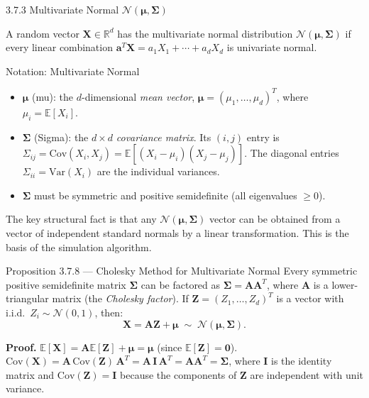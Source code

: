 \documentclass[aspectratio=169,10pt]{beamer}
\newcommand{\EE}{\mathbb{E}}
\newcommand{\RR}{\mathbb{R}}
\newcommand{\NN}{\mathcal{N}}
\begin{document}
\begin{frame}[allowframebreaks]{3.7.3 Multivariate Normal $\NN(\boldsymbol{\mu}, \boldsymbol{\Sigma})$}

A random vector $\mathbf{X} \in \RR^d$ has the multivariate normal distribution
$\NN(\boldsymbol{\mu}, \boldsymbol{\Sigma})$ if every linear combination
$\mathbf{a}^T \mathbf{X} = a_1 X_1 + \cdots + a_d X_d$ is univariate normal.

\begin{block}{Notation: Multivariate Normal}
  \begin{itemize}
    \item $\boldsymbol{\mu}$ (mu): the $d$-dimensional \emph{mean vector},
      $\boldsymbol{\mu} = (\mu_1, \ldots, \mu_d)^T$, where $\mu_i = \EE[X_i]$.
    \item $\boldsymbol{\Sigma}$ (Sigma): the $d \times d$ \emph{covariance matrix}.
      Its $(i,j)$ entry is $\Sigma_{ij} = \mathrm{Cov}(X_i, X_j) = \EE[(X_i - \mu_i)(X_j - \mu_j)]$.
      The diagonal entries $\Sigma_{ii} = \mathrm{Var}(X_i)$ are the individual variances.
    \item $\boldsymbol{\Sigma}$ must be symmetric and positive semidefinite
      (all eigenvalues $\ge 0$).
  \end{itemize}
\end{block}

The key structural fact is that any $\NN(\boldsymbol{\mu}, \boldsymbol{\Sigma})$
vector can be obtained from a vector of independent standard normals by a linear
transformation.  This is the basis of the simulation algorithm.

\begin{block}{Proposition 3.7.8 --- Cholesky Method for Multivariate Normal}
  Every symmetric positive semidefinite matrix $\boldsymbol{\Sigma}$ can be
  factored as $\boldsymbol{\Sigma} = \mathbf{A}\mathbf{A}^T$, where $\mathbf{A}$
  is a lower-triangular matrix (the \emph{Cholesky factor}).
  If $\mathbf{Z} = (Z_1, \ldots, Z_d)^T$ is a vector with i.i.d.\ $Z_i \sim \NN(0,1)$,
  then:
  \[
    \mathbf{X} = \mathbf{A}\mathbf{Z} + \boldsymbol{\mu}
    \;\sim\; \NN(\boldsymbol{\mu},\boldsymbol{\Sigma}).
  \]
\end{block}

\textbf{Proof.}
$\EE[\mathbf{X}] = \mathbf{A}\EE[\mathbf{Z}] + \boldsymbol{\mu} = \boldsymbol{\mu}$
(since $\EE[\mathbf{Z}] = \mathbf{0}$).
$\mathrm{Cov}(\mathbf{X}) = \mathbf{A}\,\mathrm{Cov}(\mathbf{Z})\,\mathbf{A}^T
= \mathbf{A}\,\mathbf{I}\,\mathbf{A}^T = \mathbf{A}\mathbf{A}^T = \boldsymbol{\Sigma}$,
where $\mathbf{I}$ is the identity matrix and $\mathrm{Cov}(\mathbf{Z}) = \mathbf{I}$
because the components of $\mathbf{Z}$ are independent with unit variance.


\end{frame}
\end{document}
